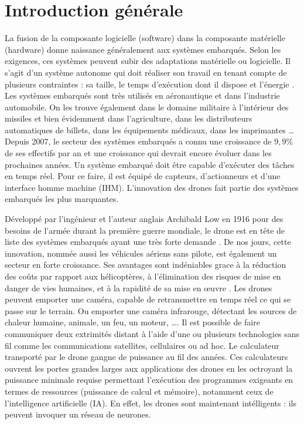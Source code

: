 \chapter*{Introduction générale}
La fusion de la composante logicielle (software) dans la composante matérielle (hardware) donne naissance généralement aux systèmes embarqués.
Selon les exigences, ces systèmes peuvent subir des adaptations matérielle ou logicielle. Il s'agit d'un système autonome qui doit réaliser son travail en tenant compte de plusieurs contraintes : sa taille, le temps d'exécution dont il dispose et l'énergie \cite{FUTURA}. Les systèmes embarqués sont très utilisés en aéronautique et dans l'industrie automobile. On les trouve également dans le domaine militaire à l'intérieur des missiles et bien évidemment dans l'agriculture, dans les distributeurs automatiques de billets, dans les équipements médicaux, dans les imprimantes \ldots
Depuis 2007, le secteur des systèmes embarqués a connu une croissance de $9,9\%$ de ses effectifs par an  et une croissance qui devrait encore évoluer dans les prochaines années\cite{PierreAudoin2012}. 
Un système embarqué doit être capable d'exécuter des tâches en temps réel. 
Pour ce faire, il est équipé de capteurs, d'actionneurs et d'une interface homme machine (IHM). 
L'innovation des drones fait partie des systèmes embarqués les plus marquantes. 

Développé par l'ingénieur et l'auteur anglais Archibald Low en 1916 pour des besoins de l'armée durant la première guerre mondiale, le drone est en tête de liste des systèmes embarqués ayant une très forte demande \cite{STUDIOFLY}. 
De nos jours, cette innovation, nommée aussi les véhicules aériens sans pilote, est également un secteur en forte croissance. 
Ses avantages sont indéniables grace à la réduction des coûts par rapport aux hélicoptères, à l'élimination des risques de mise en danger de vies humaines, et à la rapidité de sa mise en œuvre \cite{AltiGator}. 
Les drones peuvent emporter une caméra, capable de retransmettre en temps réel ce qui se passe sur le terrain. 
Ou emporter une caméra infrarouge, détectant les sources de chaleur humaine, animale, un feu, un moteur, \ldots .
Il est possible de faire communiquer deux extrimités distant à l'aide d'une ou plusieurs technologies sans fil comme les communications satellites, cellulaires ou ad hoc.
Le calculateur transporté par le drone gangne de puissance au fil des années. Ces calculateurs ouvrent les portes grandes larges aux applications des drones en les octroyant la puissance minimale requise permettant l'exécution des programmes exigeants en termes de ressources (puissance de calcul et mémoire), notamment ceux de l'intelligence artificielle (IA). En effet, les drones sont maintenant intélligents : ils peuvent invoquer un réseau de neurones.


